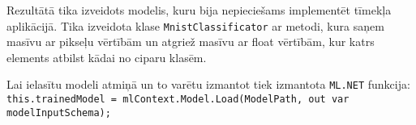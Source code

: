     

    Rezultātā tika izveidots modelis, kuru bija nepieciešams implementēt tīmekļa aplikācijā.
    Tika izveidota klase \texttt{MnistClassificator} ar metodi, kura saņem masīvu ar pikseļu vērtībām un
    atgriež masīvu ar float vērtībām, kur katrs elements
    atbilst kādai no ciparu klasēm.

    

    Lai ielasītu modeli atmiņā un to varētu izmantot tiek izmantota \texttt{ML.NET} funkcija:
    \texttt{this.trainedModel = mlContext.Model.Load(ModelPath, out var modelInputSchema);}
